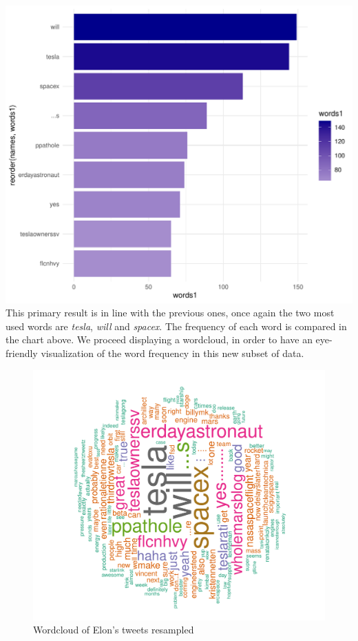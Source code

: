 \documentclass[
]{article}
\begin{document}
\includegraphics{Trial1_files/figure-latex/fig9-1.pdf} This primary
result is in line with the previous ones, once again the two most used
words are \emph{tesla}, \emph{will} and \emph{spacex}. The frequency of
each word is compared in the chart above. We proceed displaying a
wordcloud, in order to have an eye-friendly visualization of the word
frequency in this new subset of data.

\begin{figure}
\centering
\includegraphics{Trial1_files/figure-latex/fig10-1.pdf}
\caption{\label{fig:fig10}Wordcloud of Elon's tweets resampled}
\end{figure}
\end{document}
